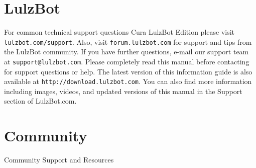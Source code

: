 %
%
%
%
%

\section{LulzBot}
\setlength{\parindent}{0pt}
For common technical support questions Cura LulzBot Edition please visit \texttt{lulzbot.com/support}. Also, visit \texttt{forum.lulzbot.com} for support and tips from the LulzBot community. If you have further questions, e-mail our support team at \texttt{support@lulzbot.com}. Please completely read this manual before contacting for support questions or help. The latest version of this information guide is also available at \texttt{http://download.lulzbot.com}. You can also find more information including images, videos, and updated versions of this manual in the Support section of LulzBot.com.

\section{Community}
Community Support and Resources

